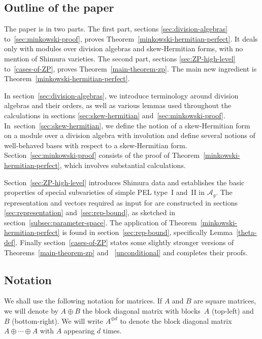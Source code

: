 \documentclass[11pt]{article}
\numberwithin{equation}{section}
\newcommand{\Ag}{\mathcal{A}_g}
\begin{document}
\subsection{Outline of the paper}

The paper is in two parts.
The first part, sections \ref{sec:division-algebras} to~\ref{sec:minkowski-proof}, proves Theorem~\ref{minkowski-hermitian-perfect}. It deals only with modules over division algebras and skew-Hermitian forms, with no mention of Shimura varieties.
The second part, sections \ref{sec:ZP-high-level} to~\ref{cases-of-ZP}, proves Theorem~\ref{main-theorem-zp}. The main new ingredient is Theorem~\ref{minkowski-hermitian-perfect}.

In section~\ref{sec:division-algebras}, we introduce terminology around division algebras and their orders, as well as various lemmas used throughout the calculations in sections \ref{sec:skew-hermitian} and~\ref{sec:minkowski-proof}.
In~section~\ref{sec:skew-hermitian}, we define the notion of a skew-Hermitian form on a module over a division algebra with involution and define several notions of well-behaved bases with respect to a skew-Hermitian form.
Section~\ref{sec:minkowski-proof} consists of the proof of Theorem~\ref{minkowski-hermitian-perfect}, which involves substantial calculations.

Section~\ref{sec:ZP-high-level} introduces Shimura data and establishes the basic properties of special subvarieties of simple PEL type~I and~II in $\Ag$.
The representation and vectors \hbox{required} as input for \cite[Th.\,1.2]{QRTUI} are constructed in sections \ref{sec:representation} and~\ref{sec:rep-bound}, as sketched in section~\ref{subsec:parameter-space}. The application of Theorem~\ref{minkowski-hermitian-perfect} is found in section~\ref{sec:rep-bound}, specifically Lemma~\ref{theta-def}. Finally section~\ref{cases-of-ZP} states some slightly stronger versions of Theorems~\ref{main-theorem-zp} and~ \ref{unconditional} and completes their proofs.

\subsection{Notation} \label{subsec:notation}

We shall use the following notation for matrices.
If $A$ and $B$ are square matrices, we will denote by $A\oplus B$ the block diagonal matrix with blocks~$A$ (top-left) and $B$ (bottom-right). We will write $A^{\oplus d}$ to denote the block diagonal matrix $A\oplus\cdots\oplus A$ with $A$ appearing $d$ times.
\end{document}
